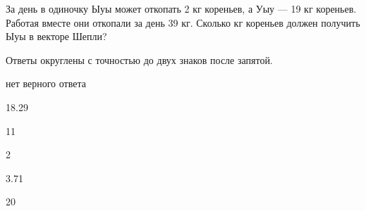 
\begin{question}
За день в одиночку Ыуы может откопать 2 кг кореньев, а Уыу --- 19 кг кореньев.
Работая вместе они откопали за день 39 кг.
Сколько кг кореньев должен получить Ыуы в векторе Шепли?

Ответы округлены с точностью до двух знаков после запятой.
\begin{answerlist}
  \item нет верного ответа
  \item 18.29
  \item 11
  \item 2
  \item 3.71
  \item 20
\end{answerlist}
\end{question}


